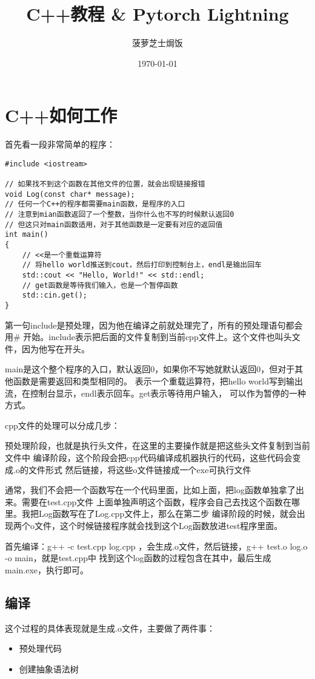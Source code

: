 \documentclass{article}
\title{C++教程 \& Pytorch Lightning}
\author{菠萝芝士焗饭}
\date{\today}
\begin{document}
\begin{sloppypar}

\maketitle
\tableofcontents

\section{C++如何工作}
首先看一段非常简单的程序：
\begin{lstlisting}
#include <iostream>

// 如果找不到这个函数在其他文件的位置，就会出现链接报错
void Log(const char* message);
// 任何一个C++的程序都需要main函数，是程序的入口
// 注意到mian函数返回了一个整数，当你什么也不写的时候默认返回0
// 但这只对main函数适用，对于其他函数是一定要有对应的返回值
int main()
{
    // <<是一个重载运算符
    // 将hello world推送到cout，然后打印到控制台上，endl是输出回车
    std::cout << "Hello, World!" << std::endl;
    // get函数是等待我们输入，也是一个暂停函数 
    std::cin.get();
}
\end{lstlisting}
第一句include是预处理，因为他在编译之前就处理完了，所有的预处理语句都会用\#
开始。include表示把后面的文件复制到当前cpp文件上。这个文件也叫头文件，因为他写在开头。

main是这个整个程序的入口，默认返回0，如果你不写她就默认返回0，但对于其他函数是需要返回和类型相同的。
\text{<<}表示一个重载运算符，把hello world写到输出流，在控制台显示，endl表示回车。get表示等待用户输入，
可以作为暂停的一种方式。

cpp文件的处理可以分成几步：
\begin{outline}
	\1 预处理阶段，也就是执行头文件，在这里的主要操作就是把这些头文件复制到当前文件中
	\1 编译阶段，这个阶段会把cpp代码编译成机器执行的代码，这些代码会变成.o的文件形式
	\1 然后链接，将这些o文件链接成一个exe可执行文件
\end{outline}
通常，我们不会把一个函数写在一个代码里面，比如上面，把log函数单独拿了出来。需要在test.cpp文件
上面单独声明这个函数，程序会自己去找这个函数在哪里。我把Log函数写在了Log.cpp文件上，那么在第二步
编译阶段的时候，就会出现两个o文件，这个时候链接程序就会找到这个Log函数放进test程序里面。

首先编译：g++ -c test.cpp log.cpp ，会生成.o文件，然后链接，g++ test.o log.o -o main，就是test.cpp中
找到这个log函数的过程包含在其中，最后生成main.exe，执行即可。

\subsection{编译}
这个过程的具体表现就是生成.o文件，主要做了两件事：
\begin{itemize}
	\item 预处理代码
	\item 创建抽象语法树	 
\end{itemize}


\end{sloppypar}
\end{document}
